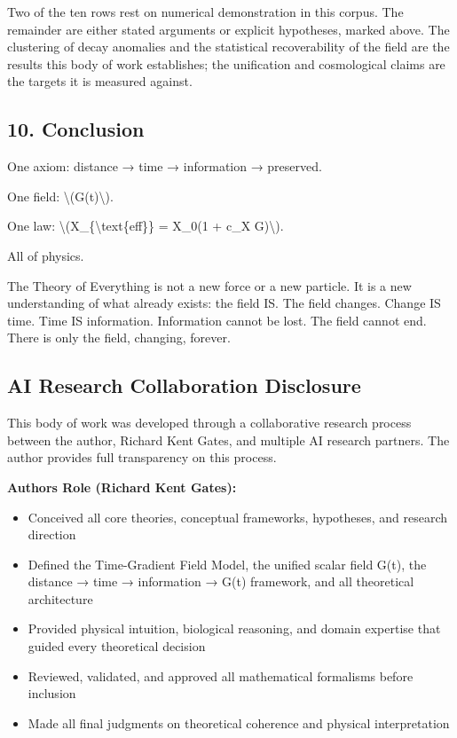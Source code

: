 \documentclass[
  10pt,
]{article}
\providecommand{\tightlist}{%
  \setlength{\itemsep}{0pt}\setlength{\parskip}{0pt}}
\begin{document}
Two of the ten rows rest on numerical demonstration in this corpus. The
remainder are either stated arguments or explicit hypotheses, marked
above. The clustering of decay anomalies and the statistical
recoverability of the field are the results this body of work
establishes; the unification and cosmological claims are the targets it
is measured against.

\hypertarget{conclusion}{%
\subsection{10. Conclusion}\label{conclusion}}

One axiom: distance → time → information → preserved.

One field: \textbackslash(G(t)\textbackslash).

One law: \textbackslash(X\_\{\textbackslash text\{eff\}\} = X\_0(1 +
c\_X G)\textbackslash).

All of physics.

The Theory of Everything is not a new force or a new particle. It is a
new understanding of what already exists: the field IS. The field
changes. Change IS time. Time IS information. Information cannot be
lost. The field cannot end. There is only the field, changing, forever.

\hypertarget{ai-research-collaboration-disclosure}{%
\subsection{AI Research Collaboration
Disclosure}\label{ai-research-collaboration-disclosure}}

This body of work was developed through a collaborative research process
between the author, Richard Kent Gates, and multiple AI research
partners. The author provides full transparency on this process.

\textbf{Author\textquotesingle s Role (Richard Kent Gates):}

\begin{itemize}
\tightlist
\item
  Conceived all core theories, conceptual frameworks, hypotheses, and
  research direction
\item
  Defined the Time-Gradient Field Model, the unified scalar field G(t),
  the distance → time → information → G(t) framework, and all
  theoretical architecture
\item
  Provided physical intuition, biological reasoning, and domain
  expertise that guided every theoretical decision
\item
  Reviewed, validated, and approved all mathematical formalisms before
  inclusion
\item
  Made all final judgments on theoretical coherence and physical
  interpretation
\end{itemize}
\end{document}
